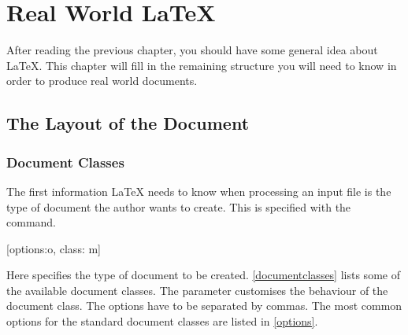 %
%
%
%

\chapter{Real World \LaTeX{}}\label{chap:realworld}

\begin{intro}
  After reading the previous chapter, you should have some general idea
  about \LaTeX{}. This chapter
  will fill in the remaining structure you will need to know in order
  to produce real world documents.
\end{intro}

\section{The Layout of the Document}

\subsection{Document Classes}\label{sec:documentclass}

The first information \LaTeX{} needs to know when processing an
input file is the type of document the author wants to create. This
is specified with the  command.
\begin{lscommand}
  [options:o, class: m]
\end{lscommand}
Here  specifies the type of document to be created.
\autoref{documentclasses} lists some of the available document classes. The
 parameter customises the behaviour of the document class.
The options have to be separated by commas. The most common options for the
standard document classes are listed in \autoref{options}.

